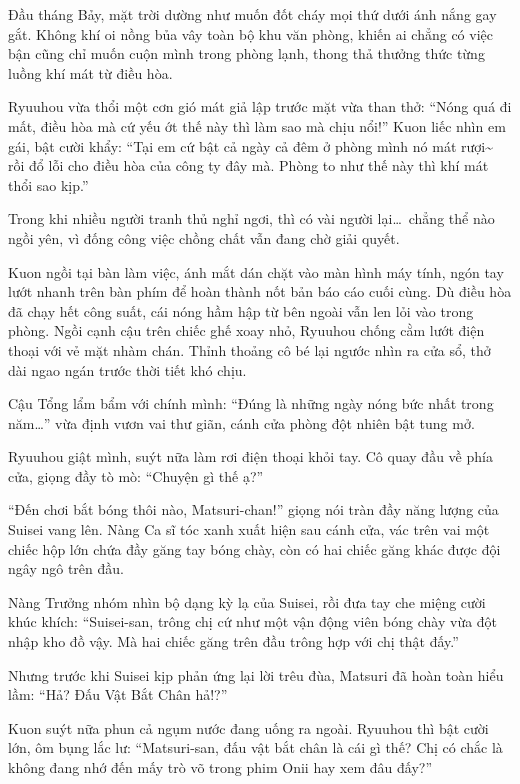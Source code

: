 \documentclass[../main.tex]{subfiles}
\begin{document}
Đầu tháng Bảy, mặt trời dường như muốn đốt cháy mọi thứ dưới ánh nắng gay gắt. Không khí oi nồng bủa vây toàn bộ khu văn phòng, khiến ai chẳng có việc bận cũng chỉ muốn cuộn mình trong phòng lạnh, thong thả thưởng thức từng luồng khí mát từ điều hòa.

Ryuuhou vừa thổi một cơn gió mát giả lập trước mặt vừa than thở: ``Nóng quá đi mất, điều hòa mà cứ yếu ớt thế này thì làm sao mà chịu nổi!'' Kuon liếc nhìn em gái, bật cười khẩy: ``Tại em cứ bật cả ngày cả đêm ở phòng mình nó mát rượi\~{} rồi đổ lỗi cho điều hòa của công ty đây mà. Phòng to như thế này thì khí mát thổi sao kịp.''

Trong khi nhiều người tranh thủ nghỉ ngơi, thì có vài người lại\dots\ chẳng thể nào ngồi yên, vì đống công việc chồng chất vẫn đang chờ giải quyết.

Kuon ngồi tại bàn làm việc, ánh mắt dán chặt vào màn hình máy tính, ngón tay lướt nhanh trên bàn phím để hoàn thành nốt bản báo cáo cuối cùng. Dù điều hòa đã chạy hết công suất, cái nóng hầm hập từ bên ngoài vẫn len lỏi vào trong phòng. Ngồi cạnh cậu trên chiếc ghế xoay nhỏ, Ryuuhou chống cằm lướt điện thoại với vẻ mặt nhàm chán. Thỉnh thoảng cô bé lại ngước nhìn ra cửa sổ, thở dài ngao ngán trước thời tiết khó chịu.

Cậu Tổng lẩm bẩm với chính mình: ``Đúng là những ngày nóng bức nhất trong năm\dots'' vừa định vươn vai thư giãn, cánh cửa phòng đột nhiên bật tung mở.

Ryuuhou giật mình, suýt nữa làm rơi điện thoại khỏi tay. Cô quay đầu về phía cửa, giọng đầy tò mò: ``Chuyện gì thế ạ?''

``Đến chơi bắt bóng thôi nào, Matsuri-chan!'' giọng nói tràn đầy năng lượng của Suisei vang lên. Nàng Ca sĩ tóc xanh xuất hiện sau cánh cửa, vác trên vai một chiếc hộp lớn chứa đầy găng tay bóng chày, còn có hai chiếc găng khác được đội ngây ngô trên đầu.


Nàng Trưởng nhóm nhìn bộ dạng kỳ lạ của Suisei, rồi đưa tay che miệng cười khúc khích: ``Suisei-san, trông chị cứ như một vận động viên bóng chày vừa đột nhập kho đồ vậy. Mà hai chiếc găng trên đầu trông hợp với chị thật đấy.''

Nhưng trước khi Suisei kịp phản ứng lại lời trêu đùa, Matsuri đã hoàn toàn hiểu lầm: ``Hả? Đấu Vật Bắt Chân hả!?''

Kuon suýt nữa phun cả ngụm nước đang uống ra ngoài. Ryuuhou thì bật cười lớn, ôm bụng lắc lư: ``Matsuri-san, đấu vật bắt chân là cái gì thế? Chị có chắc là không đang nhớ đến mấy trò võ trong phim Onii hay xem đâu đấy?''
\end{document}
